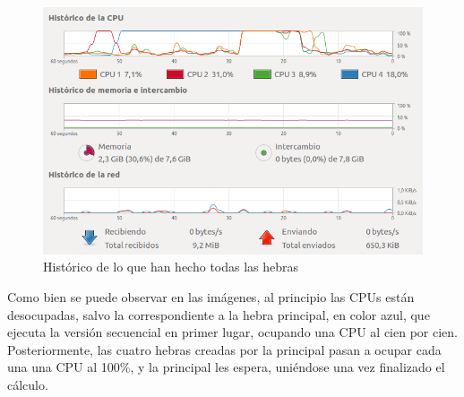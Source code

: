 \documentclass[12pt]{article}
\begin{document}
\begin{figure}[h]
	\centering
	\includegraphics[scale=0.5]{../images/8.png}
	\caption{Histórico de lo que han hecho todas las hebras}
\end{figure}

Como bien se puede observar en las imágenes, al principio las CPUs están desocupadas, salvo la correspondiente a la hebra principal, en color azul, que ejecuta la versión secuencial en primer lugar, ocupando una CPU al cien por cien. Posteriormente, las cuatro hebras creadas por la principal pasan a ocupar cada una una CPU al 100\%, y la principal les espera, uniéndose una vez finalizado el cálculo.
\end{document}

